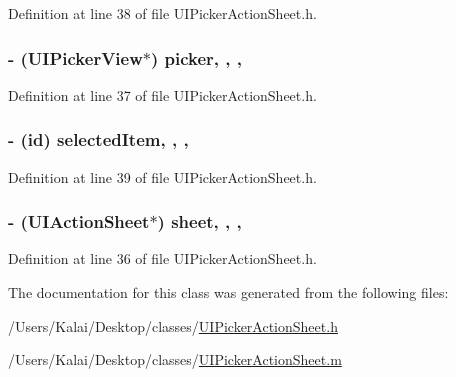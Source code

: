 Definition at line 38 of file U\-I\-Picker\-Action\-Sheet.\-h.

\hypertarget{interface_u_i_picker_action_sheet_a25afb86f0d9ba310defc06e79d7288e6}{
\subsubsection[{picker}]{\setlength{\rightskip}{0pt plus 5cm}-\/ (U\-I\-Picker\-View$\ast$) picker\hspace{0.3cm}{\ttfamily [read]}, {\ttfamily [write]}, {\ttfamily [nonatomic]}, {\ttfamily [strong]}}}\label{interface_u_i_picker_action_sheet_a25afb86f0d9ba310defc06e79d7288e6}


Definition at line 37 of file U\-I\-Picker\-Action\-Sheet.\-h.

\hypertarget{interface_u_i_picker_action_sheet_a918f026bb6b62e4f1d6cc692f76221db}{
\subsubsection[{selected\-Item}]{\setlength{\rightskip}{0pt plus 5cm}-\/ (id) selected\-Item\hspace{0.3cm}{\ttfamily [read]}, {\ttfamily [write]}, {\ttfamily [nonatomic]}, {\ttfamily [strong]}}}\label{interface_u_i_picker_action_sheet_a918f026bb6b62e4f1d6cc692f76221db}


Definition at line 39 of file U\-I\-Picker\-Action\-Sheet.\-h.

\hypertarget{interface_u_i_picker_action_sheet_a503101d9ef2e420fa163f601e1a2395e}{
\subsubsection[{sheet}]{\setlength{\rightskip}{0pt plus 5cm}-\/ (U\-I\-Action\-Sheet$\ast$) sheet\hspace{0.3cm}{\ttfamily [read]}, {\ttfamily [write]}, {\ttfamily [nonatomic]}, {\ttfamily [strong]}}}\label{interface_u_i_picker_action_sheet_a503101d9ef2e420fa163f601e1a2395e}


Definition at line 36 of file U\-I\-Picker\-Action\-Sheet.\-h.



The documentation for this class was generated from the following files\-:\begin{DoxyCompactItemize}
\item 
/\-Users/\-Kalai/\-Desktop/classes/\hyperlink{_u_i_picker_action_sheet_8h}{U\-I\-Picker\-Action\-Sheet.\-h}\item 
/\-Users/\-Kalai/\-Desktop/classes/\hyperlink{_u_i_picker_action_sheet_8m}{U\-I\-Picker\-Action\-Sheet.\-m}\end{DoxyCompactItemize}
